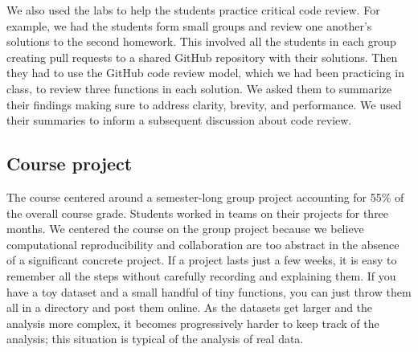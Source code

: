 We also used the labs to help the students practice critical code review.
For example, we had the students form small groups and review one another's
solutions to the second homework.
This involved all the students in each group creating pull requests to a
shared GitHub repository with their solutions.
Then they had to use the GitHub code review model, which we had been practicing
in class, to review three functions in each solution.
We asked them to summarize their findings making sure to address
clarity, brevity, and performance.
We used their summaries to inform a subsequent discussion about code review.

\subsection{Course project}\label{project}

The course centered around a semester-long group project accounting for 55\%
of the overall course grade.
Students worked in teams on their projects for three months.
We centered the course on the group project because we believe computational
reproducibility and collaboration are too abstract in the absence of a
significant concrete project.
If a project lasts just a few weeks, it is easy to remember all the steps
without carefully recording and explaining them.
If you have a toy dataset and a small handful of tiny functions, you can just
throw them all in a directory and post them online.  As the datasets get
larger and the analysis more complex, it becomes progressively harder to keep
track of the analysis; this situation is typical of the analysis of real data.


